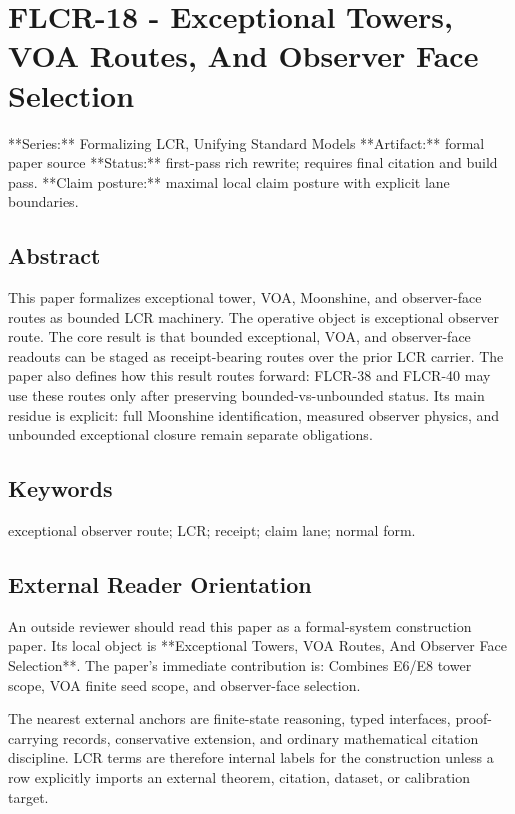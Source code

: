 \documentclass[11pt]{article}
\begin{document}
\section*{FLCR-18 - Exceptional Towers, VOA Routes, And Observer Face Selection}

**Series:** Formalizing LCR, Unifying Standard Models
**Artifact:** formal paper source
**Status:** first-pass rich rewrite; requires final citation and build pass.
**Claim posture:** maximal local claim posture with explicit lane boundaries.

\subsection*{Abstract}

This paper formalizes exceptional tower, VOA, Moonshine, and observer-face routes as bounded LCR machinery. The operative object is exceptional observer route. The core result is that bounded exceptional, VOA, and observer-face readouts can be staged as receipt-bearing routes over the prior LCR carrier. The paper also defines how this result routes forward: FLCR-38 and FLCR-40 may use these routes only after preserving bounded-vs-unbounded status. Its main residue is explicit: full Moonshine identification, measured observer physics, and unbounded exceptional closure remain separate obligations.

\subsection*{Keywords}

exceptional observer route; LCR; receipt; claim lane; normal form.

\subsection*{External Reader Orientation}

An outside reviewer should read this paper as a formal-system construction paper. Its local object is **Exceptional Towers, VOA Routes, And Observer Face Selection**. The paper's immediate contribution is: Combines E6/E8 tower scope, VOA finite seed scope, and observer-face selection.

The nearest external anchors are finite-state reasoning, typed interfaces, proof-carrying records, conservative extension, and ordinary mathematical citation discipline. LCR terms are therefore internal labels for the construction unless a row explicitly imports an external theorem, citation, dataset, or calibration target.
\end{document}
